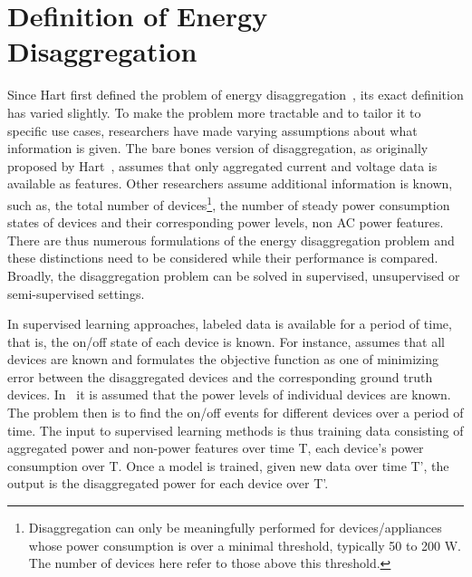 \section{Definition of Energy Disaggregation}
\label{sec:problem}


Since Hart first defined the problem of energy disaggregation~\cite{hart1992}, its
exact definition has varied slightly. To make the problem more tractable and to
tailor it to specific use cases, researchers have made varying assumptions
about what information is given.
The bare bones version of disaggregation, as originally proposed
by Hart~\cite{hart1992}, assumes that only
aggregated current and voltage data is available as features. Other
researchers assume additional information is known, such as,  
the total number of devices\footnote{Disaggregation can only be meaningfully
  performed for devices/appliances whose power consumption is over a minimal
  threshold, typically 50 to 200 W. The number of devices here refer to those above this
  threshold.}, the number of steady power consumption states of 
devices and their corresponding power levels, non AC power features. 
There are thus numerous formulations of the energy disaggregation problem and
these distinctions need to be considered while their performance is compared. 
Broadly, the disaggregation problem can be solved in supervised,
unsupervised or semi-supervised settings.


In supervised learning approaches, labeled data is available for a period of
time, that is, the on/off state of each device is known. 
For instance, \cite{liang2010load} assumes that all devices are known
and formulates the objective function as one of 
minimizing error between the disaggregated devices and 
the corresponding ground truth devices. 
In~\cite{kolter2012aistat} it is
assumed that the power levels of individual devices are known. 
The problem then is to find the on/off events
for different devices over a period of time.
The input to supervised learning methods is thus training data consisting of
aggregated power and non-power features over time T, each device's power
consumption over T.
Once a model is trained, given new data over
time T', the output is the disaggregated power for each device over T'.

